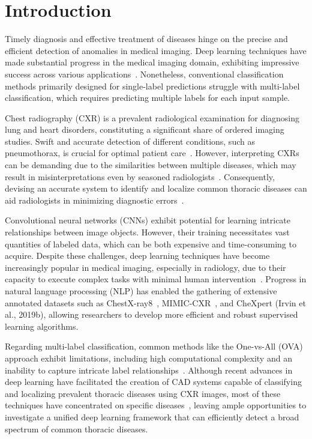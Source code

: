 \section{Introduction}

Timely diagnosis and effective treatment of diseases hinge on the precise and efficient detection of anomalies in medical imaging. Deep learning techniques have made substantial progress in the medical imaging domain, exhibiting impressive success across various applications~\cite{litjens_Survey_2017a}. Nonetheless, conventional classification methods primarily designed for single-label predictions struggle with multi-label classification, which requires predicting multiple labels for each input sample.

Chest radiography (CXR) is a prevalent radiological examination for diagnosing lung and heart disorders, constituting a significant share of ordered imaging studies. Swift and accurate detection of different conditions, such as pneumothorax, is crucial for optimal patient care~\cite{bellaviti_Increased_2016}. However, interpreting CXRs can be demanding due to the similarities between multiple diseases, which may result in misinterpretations even by seasoned radiologists~\cite{delrue_Difficulties_2011}. Consequently, devising an accurate system to identify and localize common thoracic diseases can aid radiologists in minimizing diagnostic errors~\cite{crisp_Global_2014,silverstein_Most_2016}.

Convolutional neural networks (CNNs) exhibit potential for learning intricate relationships between image objects. However, their training necessitates vast quantities of labeled data, which can be both expensive and time-consuming to acquire. Despite these challenges, deep learning techniques have become increasingly popular in medical imaging, especially in radiology, due to their capacity to execute complex tasks with minimal human intervention~\cite{jaderberg_Spatial_2015}. Progress in natural language processing (NLP) has enabled the gathering of extensive annotated datasets such as ChestX-ray8~\cite{wang_ChestXRay8_2017}, MIMIC-CXR~\cite{johnson_MIMICCXR_2019}, and CheXpert (Irvin et al., 2019b), allowing researchers to develop more efficient and robust supervised learning algorithms.

Regarding multi-label classification, common methods like the One-vs-All (OVA) approach exhibit limitations, including high computational complexity and an inability to capture intricate label relationships~\cite{tsoumakas_MultiLabel_2007}. Although recent advances in deep learning have facilitated the creation of CAD systems capable of classifying and localizing prevalent thoracic diseases using CXR images, most of these techniques have concentrated on specific diseases~\cite{jaiswal_Identifying_2019,lakhani_Deep_2017,pasa_Efficient_2019,ausawalaithong_Automatic_2018}, leaving ample opportunities to investigate a unified deep learning framework that can efficiently detect a broad spectrum of common thoracic diseases.

